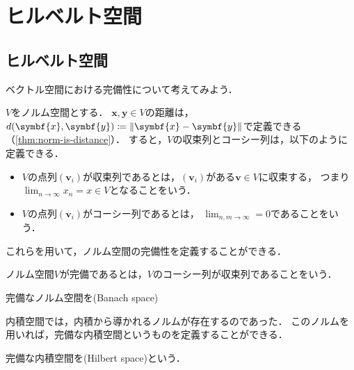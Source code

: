 \documentclass{sotsu}
\begin{document}
\tableofcontents











\section{ヒルベルト空間}

\subsection{ヒルベルト空間}

ベクトル空間における完備性について考えてみよう．

$V$をノルム空間とする．
$\symbf{x}, \symbf{y} \in V$の距離は，
$d(\symbf{x}, \symbf{y}) \coloneq \norm{\symbf{x} - \symbf{y}}$で定義できる（\cref{thm:norm-is-distance}）．
すると，$V$の収束列とコーシー列は，以下のように定義できる．
\begin{itemize}
    \item $V$の点列$(\symbf{v}_i)$が収束列であるとは，$(\symbf{v}_i)$がある$\symbf{v} \in V$に収束する，
        つまり$\lim_{n \to \infty} x_n = x \in V$となることをいう．
    \item $V$の点列$(\symbf{v}_i)$がコーシー列であるとは，
        $\lim_{n, m \to \infty} = 0$であることをいう．
\end{itemize}
これらを用いて，ノルム空間の完備性を定義することができる．

\begin{definition}
    ノルム空間$V$が完備であるとは，$V$のコーシー列が収束列であることをいう．
\end{definition}

\begin{definition}[バナッハ空間]
    \label{dfn:Banach-space}
    完備なノルム空間を(Banach space)
\end{definition}

内積空間では，内積から導かれるノルムが存在するのであった．
このノルムを用いれば，完備な内積空間というものを定義することができる．

\begin{definition}[ヒルベルト空間]
    \label{dfn:Hilbert-space}
    完備な内積空間を(Hilbert space)という．
\end{definition}
\end{document}
